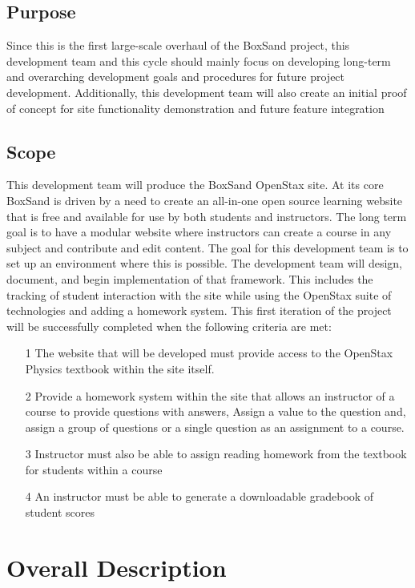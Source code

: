 \documentclass[onecolumn, draftclsnofoot,10pt, compsoc]{IEEEtran}
\begin{document}
\subsection{Purpose}
Since this is the first large-scale overhaul of the BoxSand project, this development team and this cycle should mainly focus on developing long-term and overarching development goals and procedures for future project development. Additionally, this development team will also create an initial proof of concept for site functionality demonstration and future feature integration


\subsection{Scope}
This development team will produce the BoxSand OpenStax site. At its core BoxSand is driven by a need to create an all-in-one open source learning website that is free and available for use by both students and instructors. The long term goal is to have a modular website where instructors can create a course in any subject and contribute and edit content. The goal for this development team is to set up an environment where this is possible. The development team will design, document, and begin implementation of that framework. This includes the tracking of student interaction with the site while using the OpenStax suite of technologies and adding a homework system. This first iteration of the project will be successfully completed when the following criteria are met:

\begin{enumerate}
\item[1] The website that will be developed must provide access to the OpenStax Physics textbook within the site itself. 
\item[2] Provide a homework system within the site that allows an instructor of a course to provide questions with answers, Assign a value to the question and, assign a group of questions or a single question as an assignment to a course.
\item[3] Instructor must also be able to assign reading homework from the textbook for students within a course
\item[4] An instructor must be able to generate a downloadable gradebook of student scores
\end{enumerate}


\section{Overall Description}
\end{document}
